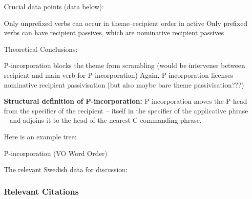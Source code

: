 \documentclass[11pt]{article}
\begin{document}
\begin{exe}
	\ex Crucial data points (data below):
	\begin{xlist}
		\ex Only unprefixed verbs can occur in theme--recipient order in active
		\ex Only prefixed verbs can have recipient passives, which are nominative recipient passives
	\end{xlist}
\end{exe}

\begin{exe}
	\ex Theoretical Conclusions:
	\begin{xlist}
		\ex P-incorporation blocks the theme from scrambling (would be intervener between recipient and main verb for P-incorporation)
		\ex Again, P-incorporation licenses nominative recipient passivisation (but also maybe bare theme passivisation???)
	\end{xlist}
\end{exe}

\textbf{Structural definition of P-incorporation:} P-incorporation moves the P-head from the specifier of the recipient -- itself in the specifier of the applicative phrase -- and adjoins it to the head of the nearest C-commanding phrase.

Here is an example tree:

\begin{exe}
\ex P-incorporation (VO Word Order)\label{ex:VO-Pincorp}\\
\end{exe}

The relevant Swedish data for discussion:

\subsubsection{Relevant Citations}
\cite{Haugen.1982,Falk.1990,Falk.1993,Holmberg.1995,Falk.1997,Anward.1989,Holmberg.2002,Lundquist.2004,Platzack.2005,Lundquist.2006,Bardal.2007,Lundquist.2013,Lundquist.2013b,Haddican.2014,Haddican.2015}
\end{document}
